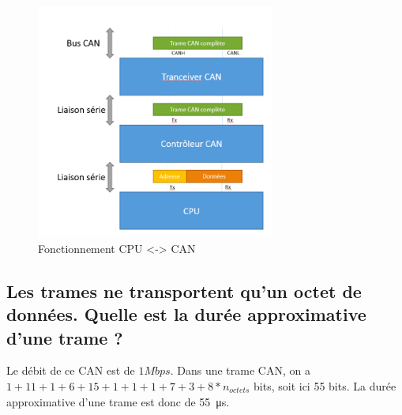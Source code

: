 \documentclass[12pt]{article}
\begin{document}
\begin{figure}[H]
\centering
\includegraphics[width=0.7\textwidth]{schema.jpg}
\caption{Fonctionnement CPU <-> CAN}
\end{figure}

\subsection{Les trames ne transportent qu'un octet de données. Quelle est la durée approximative d'une trame ?}

Le débit de ce CAN est de $1Mbps$. Dans une trame CAN, on a $1+11+1+6+15+1+1+1+7+3+8*n_{octets}$ bits, soit ici 55 bits. La durée approximative d'une trame est donc de \SI{55}{\micro\second}.
\end{document}
